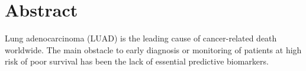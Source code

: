 \documentclass[
10pt, %
a4paper, %
oneside, %
headinclude,footinclude, %
BCOR5mm, %
]{scrartcl}
\title{\normalfont\spacedallcaps{Differential Analyses of Gene Expression}} %
\author{\spacedlowsmallcaps{John Smith \& James Smith}\\ \spacedlowsmallcaps{Group $08$}} %
\date{} %
\begin{document}

\renewcommand{\sectionmark}[1]{\markright{\spacedlowsmallcaps{#1}}} %
\lehead{\mbox{\llap{\small\thepage\kern1em\color{halfgray} \vline}\color{halfgray}\hspace{0.5em}\rightmark\hfil}} %

\pagestyle{scrheadings} %


\maketitle %

\setcounter{tocdepth}{2} %

\tableofcontents %

\listoffigures %



\section*{Abstract} %

Lung adenocarcinoma (LUAD) is the leading cause of cancer-related death worldwide. The main obstacle to early diagnosis or monitoring of patients at high risk of poor survival has been the lack of essential predictive biomarkers.
\end{document}
